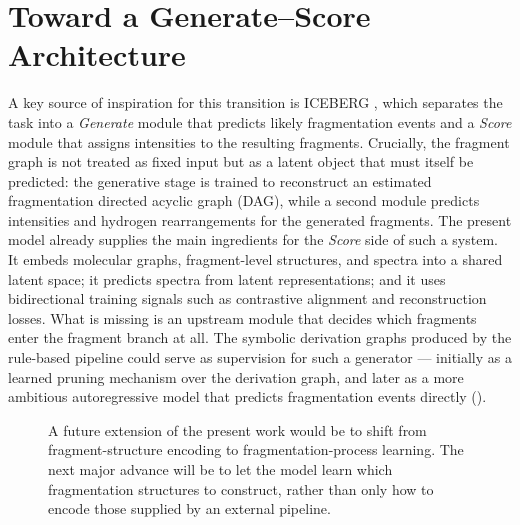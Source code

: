 \section{Toward a Generate--Score Architecture}
A key source of inspiration for this transition is ICEBERG \cite{Goldman2024}, which separates the task into a \emph{Generate} module that predicts likely fragmentation events and a \emph{Score} module that assigns intensities to the resulting fragments.
Crucially, the fragment graph is not treated as fixed input but as a latent object that must itself be predicted: the generative stage is trained to reconstruct an estimated fragmentation directed acyclic graph (DAG), while a second module predicts intensities and hydrogen rearrangements for the generated fragments.
The present model already supplies the main ingredients for the \emph{Score} side of such a system.
It embeds molecular graphs, fragment-level structures, and spectra into a shared latent space; it predicts spectra from latent representations; and it uses bidirectional training signals such as contrastive alignment and reconstruction losses.
What is missing is an upstream module that decides which fragments enter the fragment branch at all.
The symbolic derivation graphs produced by the rule-based pipeline could serve as supervision for such a generator --- initially as a learned pruning mechanism over the derivation graph, and later as a more ambitious autoregressive model that predicts fragmentation events directly ().


\begin{figure}[htbp]
    \centering
    \resizebox{0.9\textwidth}{!}{%
    }
    \caption[Future extension toward a Generate -- Score architecture]{
        A future extension of the present work would be to shift from fragment-structure encoding to fragmentation-process learning.
        The next major advance will be to let the model learn which fragmentation structures to construct,
        rather than only how to encode those supplied by an external pipeline.
    }
    \label{fig:generative-future}
\end{figure}


